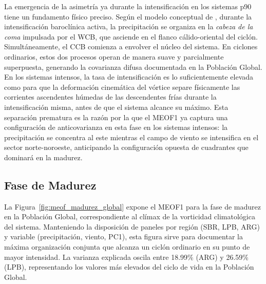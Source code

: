 La emergencia de la asimetría ya durante la intensificación en los sistemas p90 tiene un fundamento físico preciso. 
Según el modelo conceptual de \citet{browning1986conceptual}, durante la intensificación baroclínica activa, la precipitación se organiza en la \textit{cabeza de la coma} impulsada por el WCB, que asciende en el flanco cálido-oriental del ciclón. 
Simultáneamente, el CCB comienza a envolver el núcleo del sistema. 
En ciclones ordinarios, estos dos procesos operan de manera suave y parcialmente superpuesta, generando la covarianza difusa documentada en la Población Global. 
En los sistemas intensos, la tasa de intensificación es lo suficientemente elevada como para que la deformación cinemática del vórtice separe físicamente las corrientes ascendentes húmedas de las descendentes frías durante la intensificación misma, antes de que el sistema alcance su máximo. 
Esta separación prematura es la razón por la que el MEOF1 ya captura una configuración de anticovarianza en esta fase en los sistemas intensos: la precipitación se concentra al este mientras el campo de viento se intensifica en el sector norte-noroeste, anticipando la configuración opuesta de cuadrantes que dominará en la madurez.

\subsection{Fase de Madurez}
\label{subsec:meof_madurez}

La Figura~\ref{fig:meof_madurez_global} expone el MEOF1 para la fase de madurez en la Población Global, correspondiente al clímax de la vorticidad climatológica del sistema. 
Manteniendo la disposición de paneles por región (SBR, LPB, ARG) y variable (precipitación, viento, PC1), esta figura sirve para documentar la máxima organización conjunta que alcanza un ciclón ordinario en su punto de mayor intensidad. 
La varianza explicada oscila entre 18.99\% (ARG) y 26.59\% (LPB), representando los valores más elevados del ciclo de vida en la Población Global.

